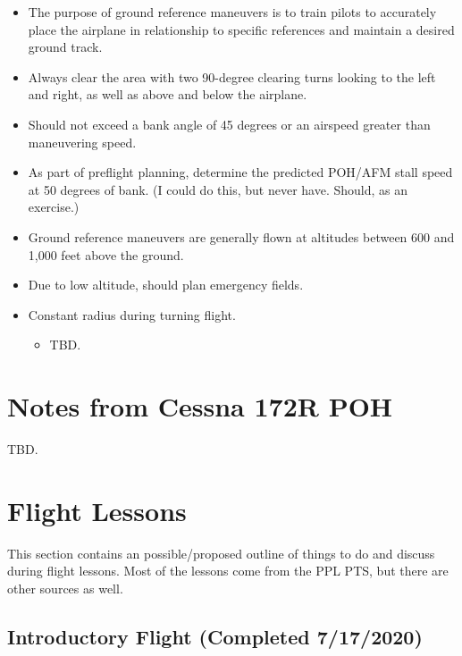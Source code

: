 \documentclass[letterpaper,10pt,titlepage]{article}
\begin{document}
\begin{itemize}
\item The purpose of ground reference maneuvers is to train pilots to accurately
      place the airplane in relationship to specific references and maintain a desired
	  ground track.
\item Always clear the area with two 90-degree clearing turns looking to the left and right,
      as well as above and below the airplane.
\item Should not exceed a bank angle of 45 degrees or an airspeed greater than maneuvering
      speed.
\item As part of preflight planning, determine the predicted POH/AFM stall speed at 50
      degrees of bank.  (I could do this, but never have.  Should, as an exercise.)
\item Ground reference maneuvers are generally flown at altitudes between 600 and 1,000
      feet above the ground.
\item Due to low altitude, should plan emergency fields.
\item Constant radius during turning flight.
      \begin{itemize}
      \item TBD.
	  \end{itemize}
\end{itemize}


\section{Notes from Cessna 172R POH}
\label{snrc0}

TBD.



\section{Flight Lessons}
\label{sfle0}

This section contains an possible/proposed outline of things to do and discuss
during flight lessons.  Most of the lessons come from the PPL PTS, but there
are other sources as well.



\subsection{Introductory Flight (Completed 7/17/2020)}
\label{sfle0:sint0}
\end{document}
